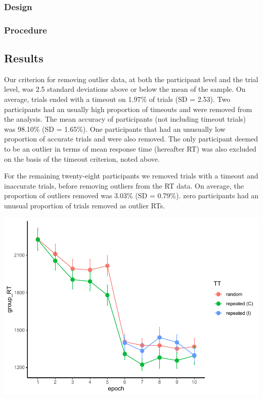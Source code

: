 \documentclass[
  man]{apa6}
\begin{document}
\hypertarget{design}{%
\subsubsection{Design}\label{design}}

\hypertarget{procedure}{%
\subsubsection{Procedure}\label{procedure}}

\hypertarget{results}{%
\subsection{Results}\label{results}}

Our criterion for removing outlier data, at both the participant level and the trial level, was 2.5 standard deviations above or below the mean of the sample. On average, trials ended with a timeout on 1.97\% of trials (SD = 2.53). Two participants had an usually high proportion of timeouts and were removed from the analysis. The mean accuracy of participants (not including timeout trials) was 98.10\% (SD = 1.65\%). One participants that had an unusually low proportion of accurate trials and were also removed. The only participant deemed to be an outlier in terms of mean response time (hereafter RT) was also excluded on the basis of the timeout criterion, noted above.

For the remaining twenty-eight participants we removed trials with a timeout and inaccurate trials, before removing outliers from the RT data. On average, the proportion of outliers removed was 3.03\% (SD = 0.79\%). zero participants had an unusual proportion of trials removed as outlier RTs.

\includegraphics{CCC_ms1_files/figure-latex/unnamed-chunk-5-1.pdf}
\end{document}
